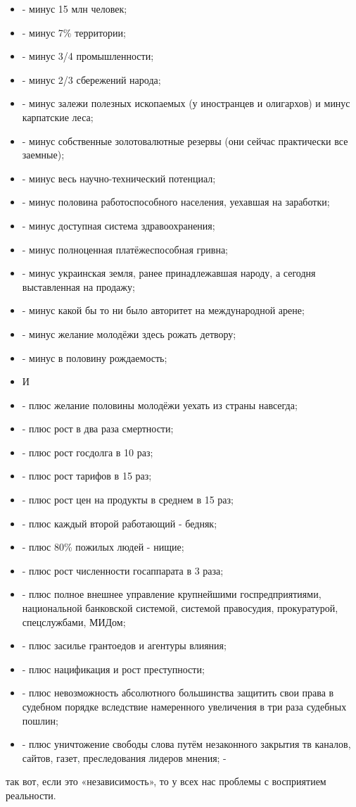 \begin{itemize}
  \item - минус 15 млн человек;
  \item - минус 7\% территории;
  \item - минус 3/4 промышленности;
  \item - минус 2/3 сбережений народа;
  \item - минус залежи полезных ископаемых (у иностранцев и олигархов) и минус карпатские леса;
  \item - минус собственные золотовалютные резервы (они сейчас практически все заемные);
  \item - минус весь научно-технический потенциал;
  \item - минус половина работоспособного населения, уехавшая на заработки;
  \item - минус доступная система здравоохранения;
  \item - минус полноценная платёжеспособная гривна;
  \item - минус украинская земля, ранее принадлежавшая народу, а сегодня выставленная на продажу; 
  \item - минус какой бы то ни было авторитет на международной арене;
  \item - минус желание молодёжи здесь рожать детвору;
  \item - минус в половину рождаемость;
  \item И
  \item - плюс желание половины молодёжи уехать из страны навсегда; 
  \item - плюс рост в два раза смертности;
  \item - плюс рост госдолга в 10 раз;
  \item - плюс рост тарифов в 15 раз;
  \item - плюс рост цен на продукты в среднем в 15 раз;
  \item - плюс каждый второй работающий - бедняк;
  \item - плюс 80\% пожилых людей - нищие;
  \item - плюс рост численности госаппарата в 3 раза;
  \item - плюс полное внешнее управление крупнейшими госпредприятиями, национальной банковской системой, системой правосудия, прокуратурой, спецслужбами, МИДом;
  \item - плюс засилье грантоедов и агентуры влияния;
  \item - плюс нацификация и рост преступности;
  \item - плюс невозможность абсолютного большинства защитить свои права в судебном порядке вследствие намеренного увеличения в три раза судебных пошлин; 
  \item - плюс уничтожение свободы слова путём незаконного закрытия тв каналов, сайтов, газет, преследования лидеров мнения; -
\end{itemize}

так вот, если это «независимость», то у всех нас проблемы с восприятием реальности.

